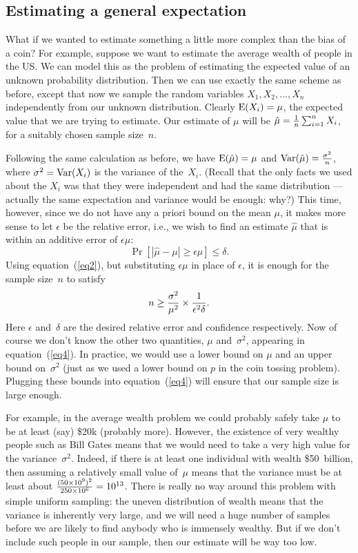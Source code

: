 \documentclass[11pt]{article}
\def\Ex#1{{\rm E}(#1)}
\def\Var#1{{\rm Var}(#1)}
\begin{document}
\subsection*{Estimating a general expectation}

What if we wanted to estimate something a little more complex than
the bias of a coin? For example, suppose we want to estimate the
average wealth of people in the US. We can model this as the problem
of estimating the expected value of an unknown probability distribution.
Then we can use exactly the same scheme as before, except that now we sample the random
variables $X_1,X_2,\dots,X_n$ independently from our unknown distribution.
Clearly $\Ex{X_i}=\mu$, the expected value that we are trying to
estimate. Our estimate of $\mu$ will be $\hat \mu={1\over n}\sum_{i=1}^n X_i$,
for a suitably chosen sample size~$n$.

Following the same calculation as before, we have
$\Ex{\hat \mu}=\mu$ and $\Var{\hat \mu}={{\sigma^2}\over n}$, where
$\sigma^2=\Var{X_i}$ is the variance of the~$X_i$. (Recall that the
only facts we used about the $X_i$ was that they were independent
and had the same distribution --- actually the same expectation and
variance would be enough: why?) This time, however, since we do not
have any a priori bound on the mean $\mu$, it makes more
sense to let $\epsilon$ be the relative error, i.e., we wish to find
an estimate $\hat \mu$ that is within an additive error of $\epsilon\mu$:
$$
   \Pr[|\hat \mu-\mu|\ge \epsilon\mu] \le \delta.  $$
Using equation~(\ref{eq2}), but substituting $\epsilon\mu$ in place of 
$\epsilon$, it is enough for the sample size~$n$ to
satisfy
\begin{equation}\label{eq4}
   n\ge {{\sigma^2}\over{\mu^2}}\times{1\over{\epsilon^2\delta}}.
\end{equation}
Here $\epsilon$ and~$\delta$ are the desired relative error and confidence
respectively.  Now of course we don't know the other two
quantities, $\mu$ and~$\sigma^2$, appearing in equation~(\ref{eq4}).
In practice, we would use a lower bound on $\mu$ and an upper bound
on~$\sigma^2$ (just as we used a lower bound on $p$ in the coin tossing
problem).  Plugging these bounds into equation~(\ref{eq4}) will
ensure that our sample size is large enough.

For example, in the average wealth problem we could probably safely
take $\mu$ to be at least (say) \$20k (probably more).  However, the
existence of very wealthy people such as Bill Gates means that we would need to
take a very high value for the variance~$\sigma^2$.  Indeed, if
there is at least one individual with wealth \$50~billion, then
assuming a relatively small value of~$\mu$ means that the variance
must be at least about ${{(50\times 10^9)^2}\over{250\times 10^6}} =
10^{13}$. 
There is really no way around this problem with simple uniform
sampling: the uneven distribution of wealth means that the variance
is inherently very large, and we will need a huge number of samples
before we are likely to find anybody who is immensely wealthy.  But
if we don't include such people in our sample, then our estimate
will be way too low.
\end{document}
